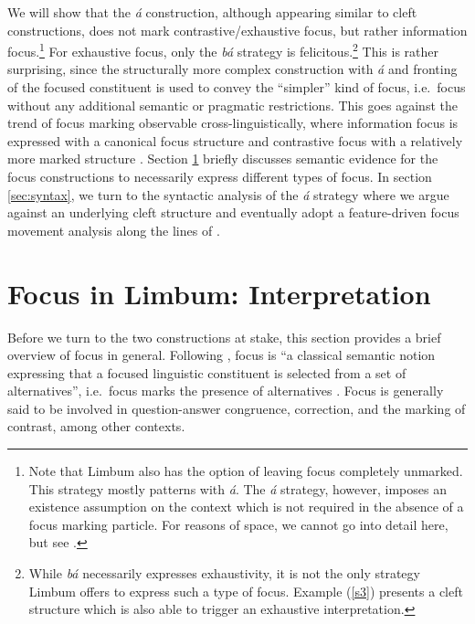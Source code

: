 \documentclass[output=paper,
modfonts
]{langscibook}
\begin{document}
We will show that the \textit{á} construction, although appearing similar to cleft constructions, does not mark contrastive/exhaustive focus, but rather information focus.\footnote{\label{fn1}Note that Limbum also has the option of leaving focus completely unmarked. This strategy mostly patterns with {\em\'a}. The {\em \'a} strategy, however, imposes an existence assumption \citep{Dryer1996} on the context which is not required in the absence of a focus marking particle. For reasons of space, we cannot go into detail here, but see \citet{Driemeletal2017}.} For exhaustive focus, only the \textit{bá} strategy is felicitous.\footnote{While {\em b\'a} necessarily expresses exhaustivity, it is not the only strategy Limbum offers to express such a type of focus. Example (\ref{s3}) presents a cleft structure which is also able to trigger an exhaustive interpretation.} This is rather surprising, since the structurally more complex construction with \textit{á} and fronting of the focused constituent is used to convey the ``simpler'' kind of focus, i.e.\ focus without any additional semantic or pragmatic restrictions. This goes against the trend of focus marking observable cross-linguistically, where information focus is expressed with a canonical focus structure and contrastive focus with a relatively more marked structure \citep{ZimmermannOnea2011}. Section \ref{sec:semantics} briefly discusses semantic evidence for the focus constructions to necessarily express different types of focus. In section \ref{sec:syntax}, we turn to the syntactic analysis of the {\em \'a} strategy where we argue against an underlying cleft structure and eventually adopt a feature-driven focus movement analysis along the lines of \citet{Cable2010}.



\section{Focus in Limbum: Interpretation}\label{sec:semantics}

Before we turn to the two constructions at stake, this section provides a brief overview of focus in general. Following \citet[2]{ZimmermannFery2010}, focus is ``a classical semantic notion expressing that a focused linguistic constituent is selected from a set of alternatives'', i.e.\ focus marks the presence of alternatives \citep{Rooth1992,Krifka2008}. Focus is generally said to be involved in question-answer congruence, correction, and the marking of contrast, among other contexts.
\end{document}
